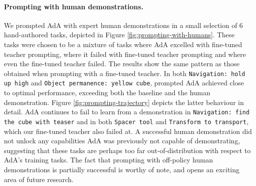 \documentclass[11pt, a4paper, logo, copyright]{deepmind}
\begin{document}
\begin{appendix}
\paragraph{Prompting with human demonstrations.} We prompted AdA with expert human demonstrations in a small selection of 6 hand-authored tasks, depicted in Figure \ref{fig:prompting-with-humans}. These tasks were chosen to be a mixture of tasks where AdA excelled with fine-tuned teacher prompting, where it failed with fine-tuned teacher prompting and where even the fine-tuned teacher failed.
The results show the same pattern as those obtained when prompting with a fine-tuned teacher. In both \texttt{Navigation: hold up high} and \texttt{Object permanence: yellow cube}, prompted AdA achieved close to optimal performance, exceeding both the baseline and the human demonstration. Figure \ref{fig:prompting-trajectory} depicts the latter behaviour in detail. AdA continues to fail to learn from a demonstration in \texttt{Navigation: find the cube with teaser} and in both \texttt{Spacer tool} and \texttt{Transform to transport}, which our fine-tuned teacher also failed at. A successful human demonstration did not unlock any capabilities AdA was previously not capable of demonstrating, suggesting that these tasks are perhaps too far out-of-distribution with respect to AdA's training tasks. The fact that prompting with off-policy human demonstrations is partially successful is worthy of note, and opens an exciting area of future research.
\end{appendix}
\end{document}
